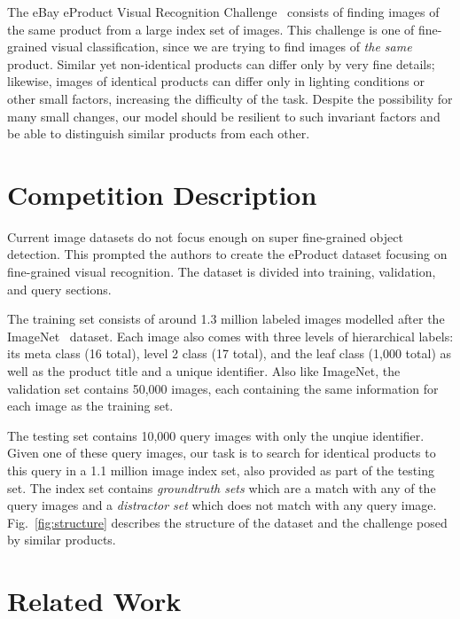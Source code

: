 \documentclass[conference]{IEEEtran}
\begin{document}
The eBay eProduct Visual Recognition Challenge~\cite{jiangbo2021ebay} consists of
finding images of the same product from a large index set of images.
This challenge is one of fine-grained visual classification, since we are trying to 
find images of \emph{the same} product. 
Similar yet non-identical products can differ only by very fine details; likewise,
images of identical products can differ only in lighting conditions or other small
factors, increasing the difficulty of the task.
Despite the possibility for many small changes, our model should be resilient to such 
invariant factors and be able to distinguish similar products from each other.

\section{Competition Description}
Current image datasets do not focus enough on super fine-grained object detection.
This prompted the authors to create the eProduct dataset focusing on fine-grained
visual recognition.
The dataset is divided into training, validation, and query sections. 

The training set consists of around 1.3 million labeled images modelled after the ImageNet~\cite{deng2009imagenet} dataset.
Each image also comes with three levels of hierarchical labels: its meta class (16 total), level 2 class (17 total),
and the leaf class (1,000 total) as well as the product title and a unique identifier.
Also like ImageNet, the validation set contains 50,000 images, each containing the same information 
for each image as the training set.

The testing set contains 10,000 query images with only the unqiue identifier.
Given one of these query images, our task is to search for identical products to this query in a 1.1 million image index set, also provided
as part of the testing set.
The index set contains \emph{groundtruth sets} which are a match with any of the query images and 
a \emph{distractor set} which does not match with any query image.
Fig.~\ref{fig:structure} describes the structure of the dataset and the challenge posed by similar products.

\section{Related Work}
\end{document}
